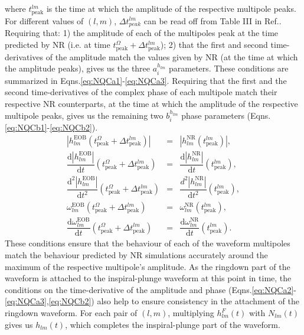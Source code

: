 \documentclass[aps,
prd,
amsmath,
amssymb,
twocolumn,
floatfix,
groupedaddress]{revtex4-1}
\newcommand{\D}{\mathrm{d}}
\newcommand{\peak}{\mathrm{peak}}
\newcommand{\EOB}{\mathrm{EOB}}
\newcommand{\NR}{\mathrm{NR}}
\begin{document}
where $t^{lm}_{\peak}$ is the time at which the amplitude of the respective multipole peaks. For different values of $(l,m)$, $\Delta t^{lm}_{peak}$ can be read off from Table III in Ref.\citep{BuonannoEOBv2Main}. Requiring that: 1) the amplitude of each of the multipoles peak at the time predicted by NR (i.e. at time $t^{\Omega}_{\peak}+\Delta t^{lm}_{\peak}$); 2) that the first and second time-derivatives of the amplitude match the values given by NR (at the time at which the amplitude peaks), gives us the three $a_i^{h_{lm}}$ parameters.  These conditions are summarized in Eqns.\eqref{eq:NQCa1}-\eqref{eq:NQCa3}. Requiring that the first and the second time-derivatives of the complex phase of each multipole match their respective NR counterparts, at the time at which the amplitude of the respective multipole peaks, gives us the remaining two $b_i^{h_{lm}}$ phase parameters (Eqns.\eqref{eq:NQCb1}-\eqref{eq:NQCb2}).
\begin{subequations}
\begin{align}
\left| h^{\EOB}_{lm}(t^{\Omega}_{\peak}+\Delta t^{lm}_{\peak}) \right| &=& \left|h^{\NR}_{lm}(t^{lm}_{\peak})\right|\label{eq:NQCa1},\\
\dfrac{\D\left| h^{\EOB}_{lm} \right|}{\D t}(t^{\Omega}_{\peak}+\Delta t^{lm}_{\peak})  &=& \dfrac{\D\left|h^{\NR}_{lm}\right|}{\D t}(t^{lm}_{\peak})\label{eq:NQCa2},\\
\dfrac{\D^2\left| h^{\EOB}_{lm}\right|}{\D t^2}(t^{\Omega}_{\peak}+\Delta t^{lm}_{\peak})  &=& \dfrac{d^2\left|h^{\NR}_{lm}\right|}{\D t^2}(t^{lm}_{\peak})\label{eq:NQCa3},\\
\omega^{\EOB}_{lm}(t^{\Omega}_{\peak}+\Delta t^{lm}_{\peak}) &=& \omega^{\NR}_{lm}(t^{lm}_{\peak})\label{eq:NQCb1},\\
\dfrac{\D\omega^{\EOB}_{lm}}{\D t}(t^{\Omega}_{\peak}+\Delta t^{lm}_{\peak})  &=& \dfrac{\D\omega^{\NR}_{lm}}{\D t}(t^{lm}_{\peak})\label{eq:NQCb2}.
\end{align}
\end{subequations}
These conditions ensure that the behaviour of each of the waveform multipoles match the behaviour predicted by NR simulations accurately around the maximum of the respective multipole's amplitude. As the ringdown part of the waveform is attached to the inspiral-plunge waveform at this point in time, the conditions on the time-derivative of the amplitude and phase (Eqns.\eqref{eq:NQCa2}-\eqref{eq:NQCa3},\eqref{eq:NQCb2}) also help to ensure consistency in the attachment of the ringdown waveform.
For each pair of $(l,m)$, multiplying $h^F_{lm}(t)$ with $N_{lm}(t)$ gives us $h_{lm}(t)$, which completes the inspiral-plunge part of the waveform.
\end{document}
